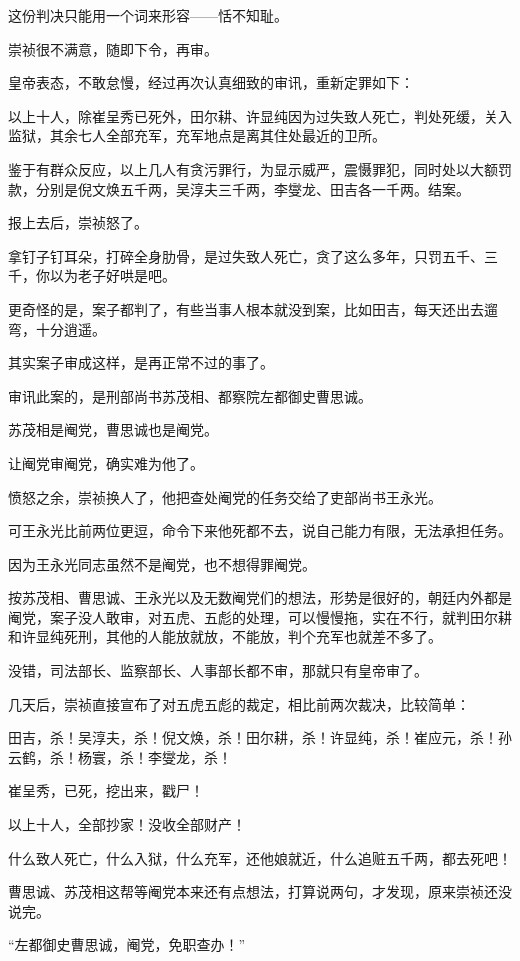 \begin{multicols}{\theparacolNo}
		这份判决只能用一个词来形容——恬不知耻。

		崇祯很不满意，随即下令，再审。

		皇帝表态，不敢怠慢，经过再次认真细致的审讯，重新定罪如下：

		以上十人，除崔呈秀已死外，田尔耕、许显纯因为过失致人死亡，判处死缓，关入监狱，其余七人全部充军，充军地点是离其住处最近的卫所。

		鉴于有群众反应，以上几人有贪污罪行，为显示威严，震慑罪犯，同时处以大额罚款，分别是倪文焕五千两，吴淳夫三千两，李燮龙、田吉各一千两。结案。

		报上去后，崇祯怒了。

		拿钉子钉耳朵，打碎全身肋骨，是过失致人死亡，贪了这么多年，只罚五千、三千，你以为老子好哄是吧。

		更奇怪的是，案子都判了，有些当事人根本就没到案，比如田吉，每天还出去遛弯，十分逍遥。

		其实案子审成这样，是再正常不过的事了。

		审讯此案的，是刑部尚书苏茂相、都察院左都御史曹思诚。

		苏茂相是阉党，曹思诚也是阉党。

		让阉党审阉党，确实难为他了。

		愤怒之余，崇祯换人了，他把查处阉党的任务交给了吏部尚书王永光。

		可王永光比前两位更逗，命令下来他死都不去，说自己能力有限，无法承担任务。

		因为王永光同志虽然不是阉党，也不想得罪阉党。

		按苏茂相、曹思诚、王永光以及无数阉党们的想法，形势是很好的，朝廷内外都是阉党，案子没人敢审，对五虎、五彪的处理，可以慢慢拖，实在不行，就判田尔耕和许显纯死刑，其他的人能放就放，不能放，判个充军也就差不多了。

		没错，司法部长、监察部长、人事部长都不审，那就只有皇帝审了。

		几天后，崇祯直接宣布了对五虎五彪的裁定，相比前两次裁决，比较简单：

		田吉，杀！吴淳夫，杀！倪文焕，杀！田尔耕，杀！许显纯，杀！崔应元，杀！孙云鹤，杀！杨寰，杀！李燮龙，杀！

		崔呈秀，已死，挖出来，戳尸！

		以上十人，全部抄家！没收全部财产！

		什么致人死亡，什么入狱，什么充军，还他娘就近，什么追赃五千两，都去死吧！

		曹思诚、苏茂相这帮等阉党本来还有点想法，打算说两句，才发现，原来崇祯还没说完。

		“左都御史曹思诚，阉党，免职查办！”


\end{multicols}
